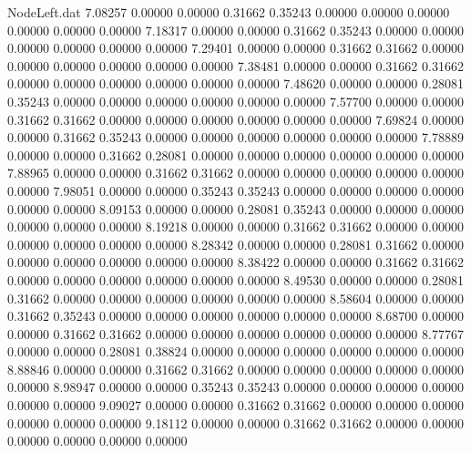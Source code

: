 \begin{filecontents}{NodeLeft.dat}
   7.08257    0.00000    0.00000     0.31662    0.35243    0.00000    0.00000    0.00000    0.00000    0.00000    0.00000
   7.18317    0.00000    0.00000     0.31662    0.35243    0.00000    0.00000    0.00000    0.00000    0.00000    0.00000
   7.29401    0.00000    0.00000     0.31662    0.31662    0.00000    0.00000    0.00000    0.00000    0.00000    0.00000
   7.38481    0.00000    0.00000     0.31662    0.31662    0.00000    0.00000    0.00000    0.00000    0.00000    0.00000
   7.48620    0.00000    0.00000     0.28081    0.35243    0.00000    0.00000    0.00000    0.00000    0.00000    0.00000
   7.57700    0.00000    0.00000     0.31662    0.31662    0.00000    0.00000    0.00000    0.00000    0.00000    0.00000
   7.69824    0.00000    0.00000     0.31662    0.35243    0.00000    0.00000    0.00000    0.00000    0.00000    0.00000
   7.78889    0.00000    0.00000     0.31662    0.28081    0.00000    0.00000    0.00000    0.00000    0.00000    0.00000
   7.88965    0.00000    0.00000     0.31662    0.31662    0.00000    0.00000    0.00000    0.00000    0.00000    0.00000
   7.98051    0.00000    0.00000     0.35243    0.35243    0.00000    0.00000    0.00000    0.00000    0.00000    0.00000
   8.09153    0.00000    0.00000     0.28081    0.35243    0.00000    0.00000    0.00000    0.00000    0.00000    0.00000
   8.19218    0.00000    0.00000     0.31662    0.31662    0.00000    0.00000    0.00000    0.00000    0.00000    0.00000
   8.28342    0.00000    0.00000     0.28081    0.31662    0.00000    0.00000    0.00000    0.00000    0.00000    0.00000
   8.38422    0.00000    0.00000     0.31662    0.31662    0.00000    0.00000    0.00000    0.00000    0.00000    0.00000
   8.49530    0.00000    0.00000     0.28081    0.31662    0.00000    0.00000    0.00000    0.00000    0.00000    0.00000
   8.58604    0.00000    0.00000     0.31662    0.35243    0.00000    0.00000    0.00000    0.00000    0.00000    0.00000
   8.68700    0.00000    0.00000     0.31662    0.31662    0.00000    0.00000    0.00000    0.00000    0.00000    0.00000
   8.77767    0.00000    0.00000     0.28081    0.38824    0.00000    0.00000    0.00000    0.00000    0.00000    0.00000
   8.88846    0.00000    0.00000     0.31662    0.31662    0.00000    0.00000    0.00000    0.00000    0.00000    0.00000
   8.98947    0.00000    0.00000     0.35243    0.35243    0.00000    0.00000    0.00000    0.00000    0.00000    0.00000
   9.09027    0.00000    0.00000     0.31662    0.31662    0.00000    0.00000    0.00000    0.00000    0.00000    0.00000
   9.18112    0.00000    0.00000     0.31662    0.31662    0.00000    0.00000    0.00000    0.00000    0.00000    0.00000

\end{filecontents}
